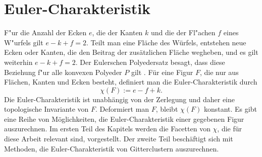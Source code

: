 
\chapter{Euler-Charakteristik}
\label{sec:Euler}

F"ur die Anzahl der Ecken $e$, die der Kanten $k$ und die der Fl"achen $f$ eines W"urfels gilt $e-k+f=2$. Teilt man eine Fl\"ache des W\"urfels, entstehen neue Ecken oder Kanten, die den Beitrag der zus\"atzlichen Fl\"ache wegheben, und es gilt weiterhin $e-k+f=2$. Der Eulerschen Polyedersatz besagt, dass diese Beziehung f"ur alle konvexen Polyeder $P$ gilt \cite{Saskin:89}. F\"ur eine Figur $F$, die nur aus Fl\"achen, Kanten und Ecken besteht, definiert man die Euler-Charakteristik durch
\begin{equation}
  \chi(F):=e-f+k.
\end{equation}
Die Euler-Charakteristik ist unabh\"angig von der Zerlegung und daher eine topologische Invariante von $F$. Deformiert  man $F$, bleibt $\chi(F)$ konstant. Es gibt eine Reihe von M\"oglichkeiten, die Euler-Charakteristik einer gegebenen Figur auszurechnen. Im ersten Teil des Kapitels werden die Facetten von $\chi$, die f\"ur diese Arbeit relevant sind, vorgestellt. Der zweite Teil besch\"aftigt sich mit Methoden, die Euler-Charakteristik von Gitterclustern auszurechnen.

